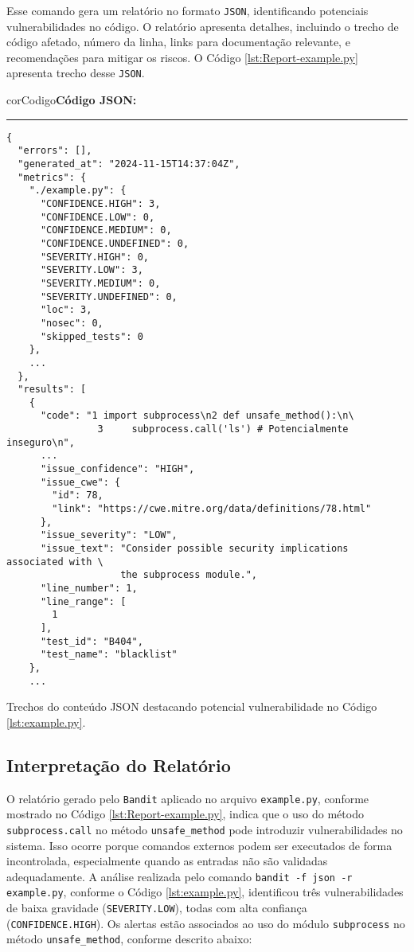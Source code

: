 Esse comando gera um relatório no formato \texttt{JSON}, identificando potenciais vulnerabilidades no código. O relatório apresenta detalhes, incluindo o trecho de código afetado, número da linha, links para documentação relevante, e recomendações para mitigar os riscos. O Código \ref{lst:Report-example.py} apresenta trecho desse \texttt{JSON}.
\begin{listing}[!ht]
    \begin{myboxCode}{corCodigo}{\textbf{Código JSON: }}\vspace{3mm}
    \hrule
    \begin{verbatim}
{
  "errors": [],
  "generated_at": "2024-11-15T14:37:04Z",
  "metrics": {
    "./example.py": {
      "CONFIDENCE.HIGH": 3,
      "CONFIDENCE.LOW": 0,
      "CONFIDENCE.MEDIUM": 0,
      "CONFIDENCE.UNDEFINED": 0,
      "SEVERITY.HIGH": 0,
      "SEVERITY.LOW": 3,
      "SEVERITY.MEDIUM": 0,
      "SEVERITY.UNDEFINED": 0,
      "loc": 3,
      "nosec": 0,
      "skipped_tests": 0
    },
    ...
  },
  "results": [
    {
      "code": "1 import subprocess\n2 def unsafe_method():\n\
                3     subprocess.call('ls') # Potencialmente inseguro\n",
      ...
      "issue_confidence": "HIGH",
      "issue_cwe": {
        "id": 78,
        "link": "https://cwe.mitre.org/data/definitions/78.html"
      },
      "issue_severity": "LOW",
      "issue_text": "Consider possible security implications associated with \
                    the subprocess module.",
      "line_number": 1,
      "line_range": [
        1
      ],
      "test_id": "B404",
      "test_name": "blacklist"
    },
    ...
\end{verbatim}
\end{myboxCode}
\caption{Trechos do conteúdo JSON destacando potencial vulnerabilidade no Código \ref{lst:example.py}.}
\label{lst:Report-example.py}
\end{listing}



\subsection{Interpretação do Relatório}

O relatório gerado pelo \texttt{Bandit} aplicado no arquivo \texttt{example.py}, conforme mostrado no Código \ref{lst:Report-example.py}, indica que o uso do método \texttt{subprocess.call} no método \texttt{unsafe\_method} pode introduzir vulnerabilidades no sistema. Isso ocorre porque comandos externos podem ser executados de forma incontrolada, especialmente quando as entradas não são validadas adequadamente.
%
A análise realizada pelo comando \texttt{bandit -f json -r example.py}, conforme o Código \ref{lst:example.py}, identificou três vulnerabilidades de baixa gravidade (\texttt{SEVERITY.LOW}), todas com alta confiança (\texttt{CONFIDENCE.HIGH}). Os alertas estão associados ao uso do módulo \texttt{subprocess} no método \texttt{unsafe\_method}, conforme descrito abaixo:

